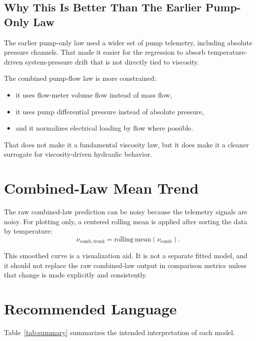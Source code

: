 \documentclass[11pt]{article}
\begin{document}
\subsection{Why This Is Better Than The Earlier Pump-Only Law}

The earlier pump-only law used a wider set of pump telemetry, including
absolute pressure channels. That made it easier for the regression to absorb
temperature-driven system-pressure drift that is not directly tied to
viscosity.

The combined pump-flow law is more constrained:
\begin{itemize}
    \item it uses flow-meter volume flow instead of mass flow,
    \item it uses pump differential pressure instead of absolute pressure,
    \item and it normalizes electrical loading by flow where possible.
\end{itemize}

That does not make it a fundamental viscosity law, but it does make it a
cleaner surrogate for viscosity-driven hydraulic behavior.

\section{Combined-Law Mean Trend}

The raw combined-law prediction can be noisy because the telemetry signals are
noisy. For plotting only, a centered rolling mean is applied after sorting the
data by temperature:
\begin{equation}
    \nu_{\mathrm{comb,trend}} = \mathrm{rolling\ mean}\!\left(
    \nu_{\mathrm{comb}}
    \right).
\end{equation}

This smoothed curve is a visualization aid. It is not a separate fitted model,
and it should not replace the raw combined-law output in comparison metrics unless
that change is made explicitly and consistently.

\section{Recommended Language}

Table~\ref{tab:summary} summarizes the intended interpretation of each model.
\end{document}
